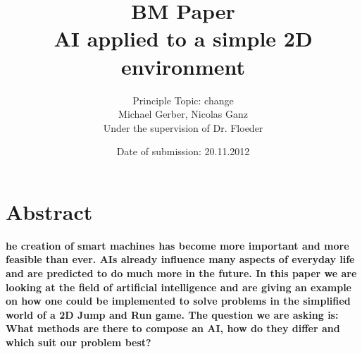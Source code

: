 %
%
%
%




\usepackage{glossaries} %
\makeglossaries





\begin{titlepage}
  \thispagestyle{empty}

  \title{
    BM Paper\bigskip\\
    \fontsize{20}{20}
    \selectfont
    AI applied to a simple 2D environment
  }
  \author{
    Principle Topic: change\bigskip\\
    Michael Gerber, Nicolas Ganz\\
    Under the supervision of Dr. Floeder
  }
  \date{Date of submission: 20.11.2012}

  \maketitle %
\end{titlepage}

\tableofcontents

\chapter{Abstract}
\textbf{he creation of smart machines has become more important and more feasible than ever. AIs already influence many aspects of everyday life and are predicted to do much more in the future. In this paper we are looking at the field of artificial intelligence and are giving an example on how one could be implemented to solve problems in the simplified world of a 2D Jump and Run game. The question we are asking is: What methods are there to compose an AI, how do they differ and which suit our problem best?}

